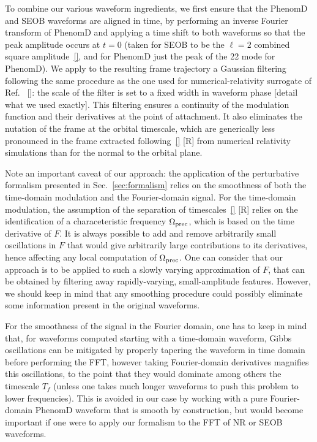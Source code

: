 \documentclass[aps,showpacs,twocolumn,
prd,superscriptaddress,nofootinbib]{revtex4-1}
\newcommand{\SM}[1]{{\color{Red} #1}}
\begin{document}
To combine our various waveform ingredients, we first ensure that the PhenomD and SEOB waveforms are aligned in time, by performing an inverse Fourier transform of PhenomD and applying a time shift to both waveforms so that the peak amplitude occurs at $t=0$ (taken for SEOB to be the $\ell=2$ combined square amplitude~\eqref{}, and for PhenomD just the peak of the 22 mode for PhenomD). We apply to the resulting frame trajectory a Gaussian filtering following the same procedure as the one used for numerical-relativity surrogate of Ref.~\cite{} \SM{[]}: the scale of the filter is set to a fixed width in waveform phase \SM{[detail what we used exactly]}. This filtering ensures a continuity of the modulation function and their derivatives at the point of attachment. It also eliminates the nutation of the frame at the orbital timescale, which are generically less pronounced in the frame extracted following~\eqref{} \SM{[R]} from numerical relativity simulations than for the normal to the orbital plane.

Note an important caveat of our approach: the application of the perturbative formalism presented in Sec.~\ref{sec:formalism} relies on the smoothness of both the time-domain modulation and the Fourier-domain signal. For the time-domain modulation, the assumption of the separation of timescales~\eqref{} \SM{[R]} relies on the identification of a characeteristic frequency $\Omega_{\rm prec}$, which is based on the time derivative of $F$. It is always possible to add and remove arbitrarily small oscillations in $F$ that would give arbitrarily large contributions to its derivatives, hence affecting any local computation of $\Omega_{\rm prec}$. One can consider that our approach is to be applied to such a slowly varying approximation of $F$, that can be obtained by filtering away rapidly-varying, small-amplitude features. However, we should keep in mind that any smoothing procedure could possibly eliminate  some information present in the original waveforms.

For the smoothness of the signal in the Fourier domain, one has to keep in mind that, for waveforms computed starting with a time-domain waveform, Gibbs oscillations can be mitigated by properly tapering the waveform in time domain before performing the FFT, however taking Fourier-domain derivatives magnifies this oscillations, to the point that they would dominate among others the timescale $T_{f}$ (unless one takes much longer waveforms to push this problem to lower frequencies). This is avoided in our case by working with a pure Fourier-domain PhenomD waveform that is smooth by construction, but would become important if one were to apply our formalism to the FFT of NR or SEOB waveforms.
\end{document}
